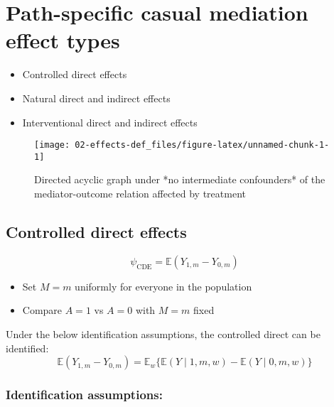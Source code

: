\documentclass[
  12pt,
]{book}
\providecommand{\tightlist}{%
  \setlength{\itemsep}{0pt}\setlength{\parskip}{0pt}}
\theoremstyle{definition}
\theoremstyle{definition}
\theoremstyle{definition}
\newcommand{\E}{\mathbb{E}}
\newcommand{\1}{\mathbbm{1}}
\begin{document}
\hypertarget{estimands}{%
\chapter{Path-specific casual mediation effect types}\label{estimands}}

\begin{itemize}
\tightlist
\item
  Controlled direct effects
\item
  Natural direct and indirect effects
\item
  Interventional direct and indirect effects
\end{itemize}

\begin{figure}

{\centering \texttt{[image: 02-effects-def\_files/figure-latex/unnamed-chunk-1-1]} 

}

\caption{Directed acyclic graph under *no intermediate confounders* of the mediator-outcome relation affected by treatment}\label{fig:unnamed-chunk-1}
\end{figure}

\hypertarget{controlled-direct-effects}{%
\section{Controlled direct effects}\label{controlled-direct-effects}}

\[\psi_{\text{CDE}} = \E(Y_{1,m} - Y_{0,m}) \]

\begin{itemize}
\tightlist
\item
  Set \(M=m\) uniformly for everyone in the population
\item
  Compare \(A=1\) vs \(A=0\) with \(M=m\) fixed
\end{itemize}

Under the below identification assumptions, the controlled direct can be identified:
\[ \E(Y_{1,m} - Y_{0,m}) = \E_w\{\E(Y \mid 1, m, w) - \E(Y \mid 0, m, w)\}\]

\hypertarget{identification-assumptions}{%
\subsection{Identification assumptions:}\label{identification-assumptions}}
\end{document}
